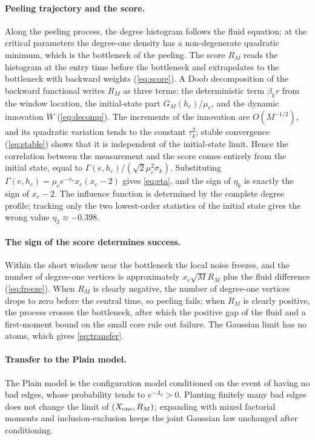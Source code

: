 \paragraph{Peeling trajectory and the score.} Along the peeling process, the degree histogram follows the
fluid equation; at the critical parameters the degree-one density has a non-degenerate quadratic minimum,
which is the bottleneck of the peeling. The score $R_M$ reads the histogram at the entry time before the
bottleneck and extrapolates to the bottleneck with backward weights (\eqref{eq:score}). A Doob decomposition
of the backward functional writes $R_M$ as three terms: the deterministic term $\beta_kr$ from the window
location, the initial-state part $G_M(h_c)/\mu_c$, and the dynamic innovation $W$ (\eqref{eq:decomp}). The
increments of the innovation are $O(M^{-1/2})$, and its quadratic variation tends to the constant
$\tau_k^2$; stable convergence (\eqref{eq:stable}) shows that it is independent of the initial-state limit.
Hence the correlation between the measurement and the score comes entirely from the initial state, equal to
$\Gamma(e,h_c)/(\sqrt2\mu_c^2\sigma_k)$. Substituting $\Gamma(e,h_c)=\mu_ce^{-x_c}x_c(x_c-2)$ gives
\eqref{eq:eta}, and the sign of $\eta_k$ is exactly the sign of $x_c-2$. The influence function is
determined by the complete degree profile; tracking only the two lowest-order statistics of the initial
state gives the wrong value $\eta_3\approx-0.398$.

\paragraph{The sign of the score determines success.} Within the short window near the bottleneck the local
noise freezes, and the number of degree-one vertices is approximately $x_c\sqrt M R_M$ plus the fluid
difference (\eqref{eq:freeze}). When $R_M$ is clearly negative, the number of degree-one vertices drops to
zero before the central time, so peeling fails; when $R_M$ is clearly positive, the process crosses the
bottleneck, after which the positive gap of the fluid and a first-moment bound on the small core rule out
failure. The Gaussian limit has no atoms, which gives \eqref{eq:transfer}.

\paragraph{Transfer to the Plain model.} The Plain model is the configuration model conditioned on the
event of having no bad edges, whose probability tends to $e^{-\Lambda_k}>0$. Planting finitely many bad
edges does not change the limit of $(X_{\rm one},R_M)$; expanding with mixed factorial moments and
inclusion-exclusion keeps the joint Gaussian law unchanged after conditioning.

